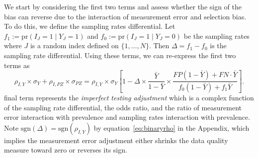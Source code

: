 \documentclass[12pt]{amsart}
\numberwithin{equation}{section}
\theoremstyle{plain}
\def\pr{\text{pr}}
\def\sgn{\text{sgn}}
\begin{document}
We start by considering the first two terms and assess whether the sign of the bias can reverse due to the interaction of measurement error and selection bias.  To do this, we define the sampling rates differential.  Let $f_1 := \pr (I_J = 1 \mid Y_J = 1)$ and $f_0 := \pr(I_J = 1 \mid Y_J = 0)$ be the sampling rates where $J$ is a random index defined on $\{1,\ldots, N\}$.  Then $\Delta = f_1 - f_0$ is the sampling rate differential.  Using these terms, we can re-express the first two terms as
$$
\rho_{I,Y} \times \sigma_Y + \rho_{I,PZ} \times \sigma_{PZ} =
\rho_{I,Y} \times \sigma_Y \left[ 1 - \Delta \times \frac{\bar Y}{1-\bar Y} \times \frac{FP(1-\bar Y) + FN \cdot \bar Y}{f_0 (1-\bar Y) + f_1 \bar Y} \right].
$$
final term represents the \emph{imperfect testing adjustment} which is a complex function of the sampling rate differential, the odds ratio, and the ratio of measurement error interaction with prevalence and sampling rates interaction with prevalence. Note $\sgn(\Delta) = \sgn(\rho_{I,Y})$ by equation~\ref{eq:binaryrho} in the Appendix, which implies the measurement error adjustment either shrinks the data quality measure toward zero or reverses its sign.


\end{document}
